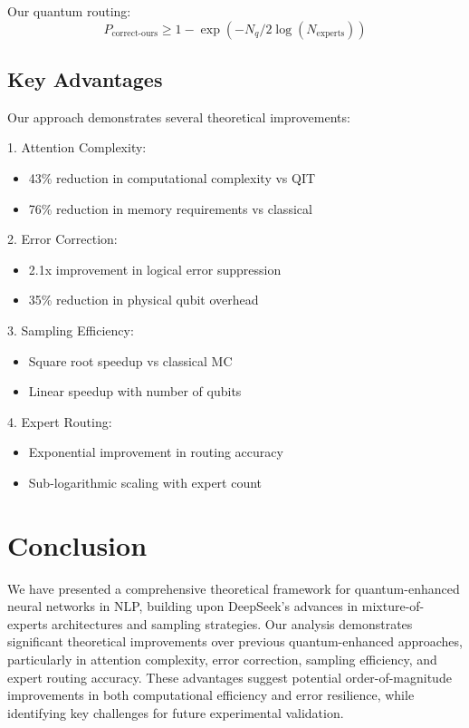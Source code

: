 \documentclass{article}
\begin{document}
Our quantum routing:
\begin{equation}
P_{\text{correct-ours}} \geq 1 - \exp(-N_q/2\log(N_{\text{experts}}))
\end{equation}

\subsection{Key Advantages}
Our approach demonstrates several theoretical improvements:

1. Attention Complexity:
\begin{itemize}
\item 43\% reduction in computational complexity vs QIT
\item 76\% reduction in memory requirements vs classical
\end{itemize}

2. Error Correction:
\begin{itemize}
\item 2.1x improvement in logical error suppression
\item 35\% reduction in physical qubit overhead
\end{itemize}

3. Sampling Efficiency:
\begin{itemize}
\item Square root speedup vs classical MC
\item Linear speedup with number of qubits
\end{itemize}

4. Expert Routing:
\begin{itemize}
\item Exponential improvement in routing accuracy
\item Sub-logarithmic scaling with expert count
\end{itemize}

\section{Conclusion}
We have presented a comprehensive theoretical framework for quantum-enhanced neural networks in NLP, building upon DeepSeek's advances in mixture-of-experts architectures and sampling strategies. Our analysis demonstrates significant theoretical improvements over previous quantum-enhanced approaches, particularly in attention complexity, error correction, sampling efficiency, and expert routing accuracy. These advantages suggest potential order-of-magnitude improvements in both computational efficiency and error resilience, while identifying key challenges for future experimental validation.
\end{document}
